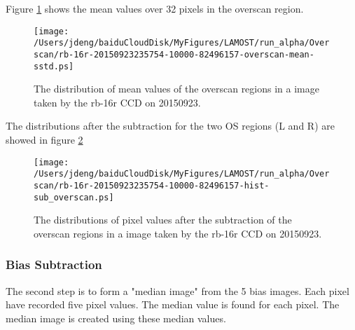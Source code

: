 \documentclass[12pt,twoside,letterpaper]{article}
\begin{document}
Figure \ref{Fig:PV_OS_mean_sstd_rb_16r} shows the mean values over 32
pixels in the overscan region. 

   \begin{figure}[!htbp]
   \begin{center}
       \texttt{[image: /Users/jdeng/baiduCloudDisk/MyFigures/LAMOST/run\_alpha/Overscan/rb-16r-20150923235754-10000-82496157-overscan-mean-sstd.ps]}
       \caption{The distribution of mean values of the overscan regions in a image taken by the rb-16r CCD on 20150923.}
       \label{Fig:PV_OS_mean_sstd_rb_16r}
   \end{center}    
   \end{figure}

The distributions after the subtraction for the two OS regions (L and
R) are showed in figure \ref{Fig:sub_OS_rb_16r}

   \begin{figure}[!htbp]
   \begin{center}
       \texttt{[image: /Users/jdeng/baiduCloudDisk/MyFigures/LAMOST/run\_alpha/Overscan/rb-16r-20150923235754-10000-82496157-hist-sub\_overscan.ps]}
       \caption{The distributions of pixel values after the subtraction of the overscan regions in a image taken by the rb-16r CCD on 20150923.}
       \label{Fig:sub_OS_rb_16r}
   \end{center}    
   \end{figure}


\subsubsection{Bias Subtraction}\label{sec:biasSub}

The second step is to form a "median image" from the 5 bias images.
Each pixel have recorded five pixel values. The median value is
found for each pixel. The median image is created using these median 
values. 
\end{document}
